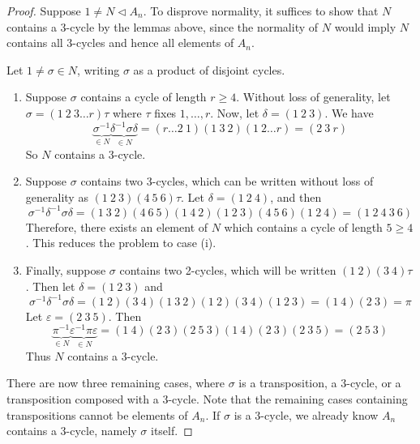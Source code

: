 \begin{proof}
	Suppose \( 1 \neq N \triangleleft A_n \).
	To disprove normality, it suffices to show that \( N \) contains a 3-cycle by the lemmas above, since the normality of \( N \) would imply \( N \) contains all 3-cycles and hence all elements of \( A_n \).

	Let \( 1 \neq \sigma \in N \), writing \( \sigma \) as a product of disjoint cycles.
	\begin{enumerate}
		\item Suppose \( \sigma \) contains a cycle of length \( r \geq 4 \).
			Without loss of generality, let \( \sigma = (1\ 2\ 3\dots r) \tau \) where \( \tau \) fixes \( 1, \dots, r \).
			Now, let \( \delta = (1\ 2\ 3) \).
			We have
			\[ \underbrace{\sigma^{-1}}_{\in N} \underbrace{\delta^{-1} \sigma \delta}_{\in N} = (r \dots 2\ 1)(1\ 3\ 2)(1\ 2\dots r) = (2\ 3\ r) \]
			So \( N \) contains a 3-cycle.
		\item Suppose \( \sigma \) contains two 3-cycles, which can be written without loss of generality as \( (1\ 2\ 3)(4\ 5\ 6) \tau \).
			Let \( \delta = (1\ 2\ 4) \), and then
			\[ \sigma^{-1} \delta^{-1} \sigma \delta = (1\ 3\ 2)(4\ 6\ 5)(1\ 4\ 2)(1\ 2\ 3)(4\ 5\ 6)(1\ 2\ 4) = (1\ 2\ 4\ 3\ 6) \]
			Therefore, there exists an element of \( N \) which contains a cycle of length \( 5 \geq 4 \).
			This reduces the problem to case (i).
		\item Finally, suppose \( \sigma \) contains two 2-cycles, which will be written \( (1\ 2)(3\ 4)\tau \).
			Then let \( \delta = (1\ 2\ 3) \) and
			\[ \sigma^{-1} \delta^{-1} \sigma \delta = (1\ 2)(3\ 4)(1\ 3\ 2)(1\ 2)(3\ 4)(1\ 2\ 3) = (1\ 4)(2\ 3) = \pi \]
			Let \( \varepsilon = (2\ 3\ 5) \).
			Then
			\[ \underbrace{\pi^{-1}}_{\in N} \underbrace{\varepsilon^{-1} \pi \varepsilon}_{\in N} = (1\ 4)(2\ 3)(2\ 5\ 3)(1\ 4)(2\ 3)(2\ 3\ 5) = (2\ 5\ 3) \]
			Thus \( N \) contains a 3-cycle.
	\end{enumerate}
	There are now three remaining cases, where \( \sigma \) is a transposition, a 3-cycle, or a transposition composed with a 3-cycle.
	Note that the remaining cases containing transpositions cannot be elements of \( A_n \).
	If \( \sigma \) is a 3-cycle, we already know \( A_n \) contains a 3-cycle, namely \( \sigma \) itself.
\end{proof}
